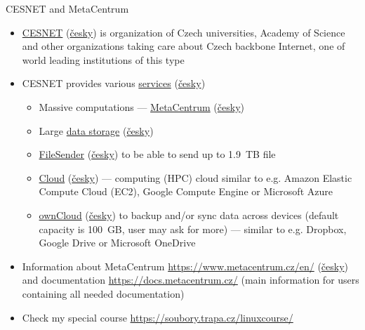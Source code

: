 \documentclass[compress, xelatex, 11pt, xcolor=svgnames, aspectratio=169, url={hyphens, lowtilde}]{beamer}
\begin{document}
\begin{frame}{CESNET and MetaCentrum}
	\begin{itemize}
		\item \href{https://www.cesnet.cz/en}{CESNET} (\href{https://www.cesnet.cz/}{česky}) is organization of Czech universities, Academy of Science and other organizations taking care about Czech backbone Internet, one of world leading institutions of this type
		\item CESNET provides various \href{https://www.cesnet.cz/en/services}{services} (\href{https://www.cesnet.cz/sluzby/}{česky})
		\begin{itemize}
			\item Massive computations --- \href{https://www.cesnet.cz/en/services/computing-2/metacentrum-10}{MetaCentrum} (\href{https://www.cesnet.cz/sluzby/vypocty-2/narocne-vypocty-metacentrum-10}{česky})
			\item Large \href{https://www.cesnet.cz/en/services/data-storage-3}{data storage} (\href{https://www.cesnet.cz/sluzby/datova-uloziste-3/datova-uloziste-13}{česky})
			\item \href{https://www.cesnet.cz/en/services/data-storage-3/filesender-15}{FileSender} (\href{https://www.cesnet.cz/sluzby/datova-uloziste-3/filesender-15}{česky}) to be able to send up to 1.9~TB file
			\item \href{https://www.metacentrum.cz/en/Sluzby/Cloud/}{Cloud} (\href{https://www.metacentrum.cz/cs/Sluzby/Cloud/}{česky}) --- computing (HPC) cloud similar to e.g. Amazon Elastic Compute Cloud (EC2), Google Compute Engine or Microsoft Azure
			\item \href{https://www.cesnet.cz/en/services/data-storage-3/owncloud-16}{ownCloud} (\href{https://www.cesnet.cz/sluzby/datova-uloziste-3/owncloud-16}{česky}) to backup and/or sync data across devices (default capacity is 100~GB, user may ask for more) --- similar to e.g. Dropbox, Google Drive or Microsoft OneDrive
		\end{itemize}
		\item Information about MetaCentrum \url{https://www.metacentrum.cz/en/} (\href{https://www.metacentrum.cz/cs/}{česky}) and documentation \url{https://docs.metacentrum.cz/} (main information for users containing all needed documentation)
		\item Check my special course \url{https://soubory.trapa.cz/linuxcourse/}
	\end{itemize}
\end{frame}
\end{document}
